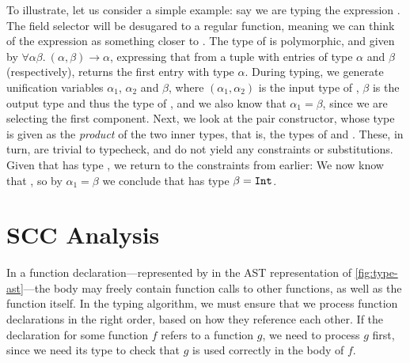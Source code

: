 
To illustrate, let us consider a simple example: say we are typing the
expression . The field selector  will be desugared
to a regular function, meaning we can think of the expression as something
closer to . The type of  is polymorphic, and
given by $\forall \alpha \beta.\ (\alpha,\beta) \to \alpha$, expressing that
from a tuple with entries of type $\alpha$ and $\beta$ (respectively),
 returns the first entry with type $\alpha$.
During typing, we generate unification variables $\alpha_1$, $\alpha_2$ and
$\beta$, where $(\alpha_1,\alpha_2)$ is the input type of , $\beta$
is the output type and thus the type of , and we also know
that $\alpha_1 = \beta$, since we are selecting the first component.
Next, we look at the pair constructor, whose type is given as the \emph{product}
of the two inner types, that is, the types of  and .
These, in turn, are trivial to typecheck, and do not yield any constraints or
substitutions. Given that  has type , we return
to the constraints from earlier:
We now know that , so by
$\alpha_1 = \beta$ we conclude that  has type
$\beta = \texttt{Int}$.





\section{SCC Analysis}

In a function declaration---represented by  in the
AST representation of \cref{fig:type-ast}---the body may freely contain function
calls to other functions, as well as the function itself.
In the typing algorithm, we must ensure that we process function declarations in
the right order, based on how they reference each other.
If the declaration for some function $f$ refers to a function $g$, we need to
process $g$ first, since we need its type to check that $g$ is used correctly in
the body of $f$.


